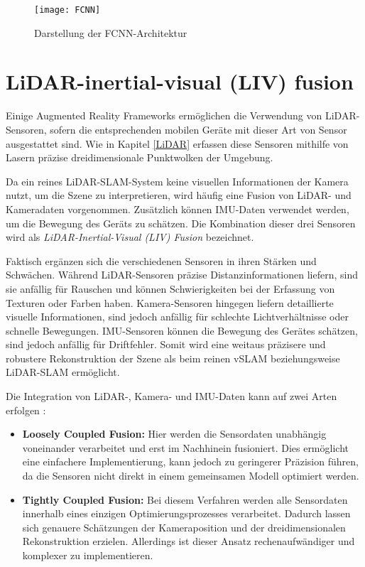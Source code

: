 \begin{figure}
    \centering
    \texttt{[image: FCNN]}
    \caption{Darstellung der FCNN-Architektur \cite{long2014fcnn}\label{fig:FCNN}}\par
\end{figure}

\section{LiDAR-inertial-visual (LIV) fusion} \label{sec:LIV}

Einige Augmented Reality Frameworks ermöglichen die Verwendung von LiDAR-Sensoren, sofern die entsprechenden mobilen Geräte mit dieser Art von Sensor ausgestattet sind. Wie in Kapitel \ref{LiDAR} erfassen diese Sensoren mithilfe von Lasern präzise dreidimensionale Punktwolken der Umgebung. \cite{appledevdoc, doerner2022virtual}

Da ein reines LiDAR-SLAM-System keine visuellen Informationen der Kamera nutzt, um die Szene zu interpretieren, wird häufig eine Fusion von LiDAR- und Kameradaten vorgenommen. Zusätzlich können IMU-Daten verwendet werden, um die Bewegung des Geräts zu schätzen. Die Kombination dieser drei Sensoren wird als \emph{LiDAR-Inertial-Visual (LIV) Fusion} bezeichnet. \cite{zhang2024lidarslam}

Faktisch ergänzen sich die verschiedenen Sensoren in ihren Stärken und Schwächen. Während LiDAR-Sensoren präzise Distanzinformationen liefern, sind sie anfällig für Rauschen und können Schwierigkeiten bei der Erfassung von Texturen oder Farben haben. Kamera-Sensoren hingegen liefern detaillierte visuelle Informationen, sind jedoch anfällig für schlechte Lichtverhältnisse oder schnelle Bewegungen. IMU-Sensoren können die Bewegung des Gerätes schätzen, sind jedoch anfällig für Driftfehler. Somit wird eine weitaus präzisere und robustere Rekonstruktion der Szene als beim reinen vSLAM beziehungsweise LiDAR-SLAM ermöglicht. \cite{zhang2024lidarslam}

Die Integration von LiDAR-, Kamera- und IMU-Daten kann auf zwei Arten erfolgen \cite{zhang2024lidarslam}:
\begin{itemize}
    \item \textbf{Loosely Coupled Fusion:} Hier werden die Sensordaten unabhängig voneinander verarbeitet und erst im Nachhinein fusioniert. Dies ermöglicht eine einfachere Implementierung, kann jedoch zu geringerer Präzision führen, da die Sensoren nicht direkt in einem gemeinsamen Modell optimiert werden.
    \item \textbf{Tightly Coupled Fusion:} Bei diesem Verfahren werden alle Sensordaten innerhalb eines einzigen Optimierungsprozesses verarbeitet. Dadurch lassen sich genauere Schätzungen der Kameraposition und der dreidimensionalen Rekonstruktion erzielen. Allerdings ist dieser Ansatz rechenaufwändiger und komplexer zu implementieren.
\end{itemize}

